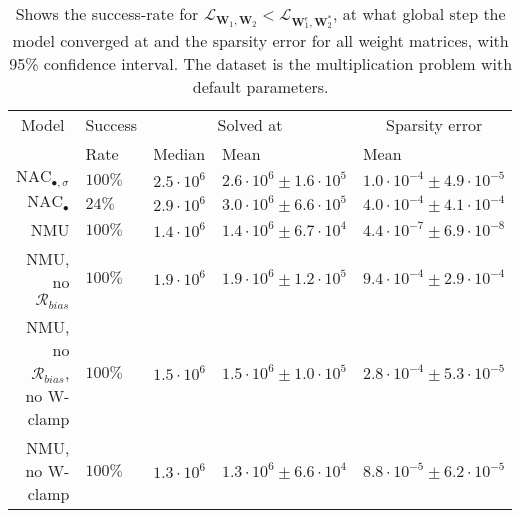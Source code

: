 \begin{table}[!h]

\caption{\label{tab:function-task-static-ablation}Shows the success-rate for $\mathcal{L}_{\mathbf{W}_1, \mathbf{W}_2} < \mathcal{L}_{\mathbf{W}_1^\epsilon, \mathbf{W}_2^*}$, at what global step the model converged at and the sparsity error for all weight matrices, with 95\% confidence interval. The dataset is the multiplication problem with default parameters.}
\centering
\begin{tabular}{rllll}
\toprule
\multicolumn{1}{c}{Model} & \multicolumn{1}{c}{Success} & \multicolumn{2}{c}{Solved at} & \multicolumn{1}{c}{Sparsity error} \\
\cmidrule(l{3pt}r{3pt}){1-1} \cmidrule(l{3pt}r{3pt}){2-2} \cmidrule(l{3pt}r{3pt}){3-4} \cmidrule(l{3pt}r{3pt}){5-5}
 & Rate & Median & Mean & Mean\\
\midrule
$\mathrm{NAC}_{\bullet,\sigma}$ & $100\%$ & $2.5 \cdot 10^{6}$ & $2.6 \cdot 10^{6} \pm 1.6 \cdot 10^{5}$ & $1.0 \cdot 10^{-4} \pm 4.9 \cdot 10^{-5}$\\

$\mathrm{NAC}_{\bullet}$ & $24\%$ & $2.9 \cdot 10^{6}$ & $3.0 \cdot 10^{6} \pm 6.6 \cdot 10^{5}$ & $4.0 \cdot 10^{-4} \pm 4.1 \cdot 10^{-4}$\\

NMU & $100\%$ & $1.4 \cdot 10^{6}$ & $1.4 \cdot 10^{6} \pm 6.7 \cdot 10^{4}$ & $4.4 \cdot 10^{-7} \pm 6.9 \cdot 10^{-8}$\\

NMU, no $\mathcal{R}_{bias}$ & $100\%$ & $1.9 \cdot 10^{6}$ & $1.9 \cdot 10^{6} \pm 1.2 \cdot 10^{5}$ & $9.4 \cdot 10^{-4} \pm 2.9 \cdot 10^{-4}$\\

NMU, no $\mathcal{R}_{bias}$, no W-clamp & $100\%$ & $1.5 \cdot 10^{6}$ & $1.5 \cdot 10^{6} \pm 1.0 \cdot 10^{5}$ & $2.8 \cdot 10^{-4} \pm 5.3 \cdot 10^{-5}$\\

NMU, no W-clamp & $100\%$ & $1.3 \cdot 10^{6}$ & $1.3 \cdot 10^{6} \pm 6.6 \cdot 10^{4}$ & $8.8 \cdot 10^{-5} \pm 6.2 \cdot 10^{-5}$\\
\bottomrule
\end{tabular}
\end{table}
